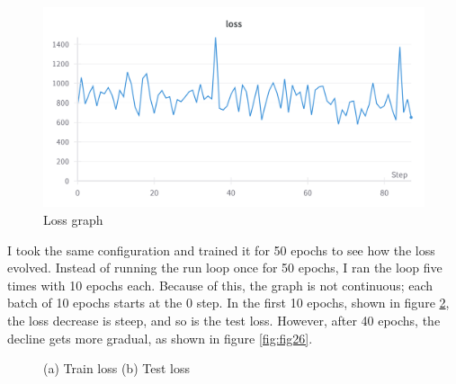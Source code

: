 \begin{figure}[!ht]
    \centering
    \includegraphics[width=1\linewidth]{figures/Figure27.png}
    \caption{Loss graph}
    \label{fig:fig24}
\end{figure}
I took the same configuration and trained it for 50 epochs to see how the loss evolved. Instead of running the run loop once for 50 epochs, I ran the loop five times with 10 epochs each. Because of this, the graph is not continuous; each batch of 10 epochs starts at the 0 step. In the first 10 epochs, shown in figure \ref{fig:fig25}, the loss decrease is steep, and so is the test loss. However, after 40 epochs, the decline gets more gradual, as shown in figure \ref{fig:fig26}.\\
\begin{figure}[!ht]
    \label{fig:fig25}
    \caption{(a) Train loss (b) Test loss}
\end{figure}
